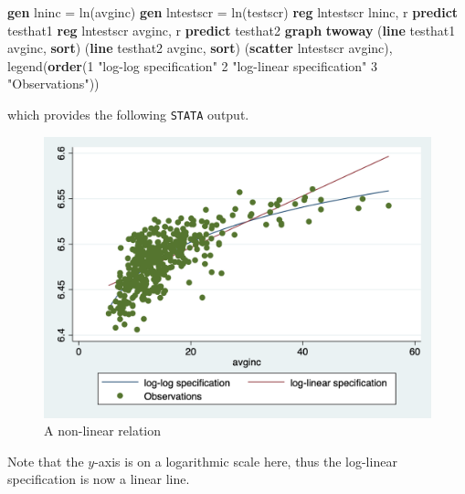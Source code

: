\documentclass[
]{book}
\newenvironment{Shaded}{\begin{snugshade}}{\end{snugshade}}
\newcommand{\BaseNTok}[1]{\textcolor[rgb]{0.00,0.00,0.81}{#1}}
\newcommand{\FunctionTok}[1]{\textcolor[rgb]{0.00,0.00,0.00}{#1}}
\newcommand{\KeywordTok}[1]{\textcolor[rgb]{0.13,0.29,0.53}{\textbf{#1}}}
\newcommand{\NormalTok}[1]{#1}
\newcommand{\StringTok}[1]{\textcolor[rgb]{0.31,0.60,0.02}{#1}}
\begin{document}
\begin{Shaded}
\begin{Highlighting}[]
\KeywordTok{gen}\NormalTok{ lninc = }\FunctionTok{ln}\NormalTok{(avginc)}
\KeywordTok{gen}\NormalTok{ lntestscr = }\FunctionTok{ln}\NormalTok{(testscr)}
\KeywordTok{reg}\NormalTok{ lntestscr lninc, }\FunctionTok{r}
\KeywordTok{predict}\NormalTok{ testhat1}
\KeywordTok{reg}\NormalTok{ lntestscr avginc, }\FunctionTok{r}
\KeywordTok{predict}\NormalTok{ testhat2}
\KeywordTok{graph} \KeywordTok{twoway}\NormalTok{ (}\KeywordTok{line}\NormalTok{ testhat1 avginc, }\KeywordTok{sort}\NormalTok{) (}\KeywordTok{line}\NormalTok{ testhat2 avginc, }\KeywordTok{sort}\NormalTok{) (}\KeywordTok{scatter}\NormalTok{ lntestscr avginc), }\BaseNTok{legend}\NormalTok{(}\KeywordTok{order}\NormalTok{(1 }\StringTok{"log{-}log specification"}\NormalTok{ 2 }\StringTok{"log{-}linear specification"}\NormalTok{ 3 }\StringTok{"Observations"}\NormalTok{)) }
\end{Highlighting}
\end{Shaded}

which provides the following \texttt{STATA} output.

\begin{figure}

{\centering \includegraphics[width=600px]{./figures/scattercompare} 

}

\caption{A non-linear relation}\label{fig:scattercompare}
\end{figure}

Note that the \(y\)-axis is on a logarithmic scale here, thus the log-linear specification is now a linear line.
\end{document}
